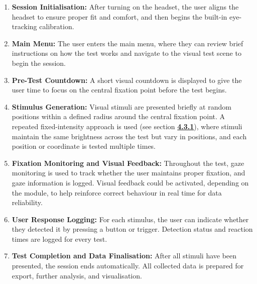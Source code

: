 \documentclass{l4proj}
\begin{document}
\begin{enumerate}
    \item \textbf{Session Initialisation:} \newline
        After turning on the headset, the user aligns the headset to ensure proper fit and comfort, and then begins the built-in eye-tracking calibration.

    \item \textbf{Main Menu:} \newline
        The user enters the main menu, where they can review brief instructions on how the test works and navigate to the visual test scene to begin the session.

    \item \textbf{Pre-Test Countdown:} \newline
         A short visual countdown is displayed to give the user time to focus on the central fixation point before the test begins.

    \item \textbf{Stimulus Generation:} \newline
        Visual stimuli are presented briefly at random positions within a defined radius around the central fixation point. A repeated fixed-intensity approach is used (see section \hyperref[sec: RFIA]{\textbf{4.3.1}}), where stimuli maintain the same brightness across the test but vary in positions, and each position or coordinate is tested multiple times.

    \item \textbf{Fixation Monitoring and Visual Feedback:} \newline
        Throughout the test, gaze monitoring is used to track whether the user maintains proper fixation, and gaze information is logged. Visual feedback could be activated, depending on the module, to help reinforce correct behaviour in real time for data reliability.

    \item \textbf{User Response Logging:} \newline
        For each stimulus, the user can indicate whether they detected it by pressing a button or trigger. Detection status and reaction times are logged for every test.

    \item \textbf{Test Completion and Data Finalisation:} \newline
        After all stimuli have been presented, the session ends automatically. All collected data is prepared for export, further analysis, and visualisation.
\end{enumerate}
\end{document}
